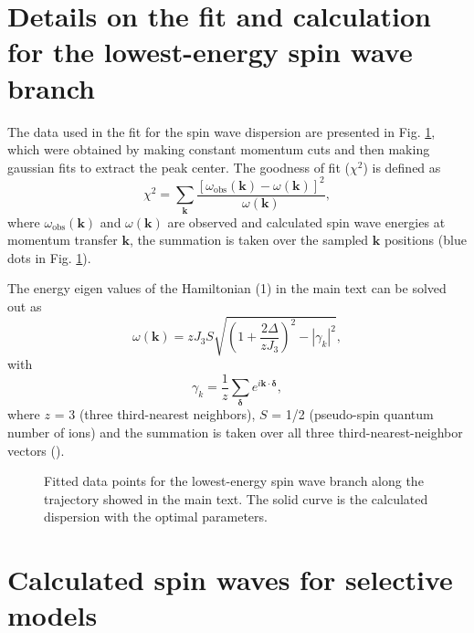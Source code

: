 \documentclass[%
reprint,
superscriptaddress,
amsmath,amssymb,
aps,
prb,
]{revtex4-2}
\begin{document}
	\section{Details on the fit and calculation for the lowest-energy spin wave branch}
	
	The data used in the fit for the spin wave dispersion are presented in Fig. \ref{figs3}, which were obtained by making constant momentum cuts and then making gaussian fits to extract the peak center. The goodness of fit ($\chi^2$) is defined as
	\begin{equation}
		\chi^2=\sum_{\textbf{k}}\frac{\left[\omega_{\mathrm{obs}}(\textbf{k})-\omega(\textbf{k})\right]^2}{\omega(\textbf{k})},
	\end{equation}
	where $\omega_{\mathrm{obs}}(\textbf{k})$ and $\omega(\textbf{k})$ are observed and calculated spin wave energies at momentum transfer $\textbf{k}$, the summation is taken over the sampled $\textbf{k}$ positions (blue dots in Fig. \ref{figs3}).

	The energy eigen values of the Hamiltonian (1) in the main text can be solved out as \cite{Fazekas1999}
	\begin{equation}
		\omega(\textbf{k})=zJ_3S\sqrt{\left(1+\frac{2\Delta}{zJ_3}\right)^2-|\gamma_k|^2},
	\end{equation}
	with
	\begin{equation}
		\gamma_k=\frac{1}{z}\sum_{\bm{\delta}}e^{i\textbf{k}\cdot\bm{\delta}},
	\end{equation}
	where $z$ = 3 (three third-nearest neighbors), $S$ = 1/2  (pseudo-spin quantum number of  ions) and the summation is taken over all three third-nearest-neighbor vectors (\bm{$\delta$}).
	
	\begin{figure}[b!]
		\caption{Fitted data points for the lowest-energy spin wave branch along the trajectory showed in the main text. The solid curve is the calculated dispersion with the optimal parameters.}
		\label{figs3}
	\end{figure}
	
	\section{Calculated spin waves for selective models}
	
\end{document}
